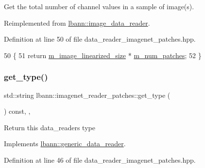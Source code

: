 Get the total number of channel values in a sample of image(s). 



Reimplemented from \hyperlink{classlbann_1_1image__data__reader_a26b8566e76ba99c017a84c49a9dec37c}{lbann\+::image\+\_\+data\+\_\+reader}.



Definition at line 50 of file data\+\_\+reader\+\_\+imagenet\+\_\+patches.\+hpp.


\begin{DoxyCode}
50                                                 \{
51     \textcolor{keywordflow}{return} \hyperlink{classlbann_1_1image__data__reader_af512f1f866c0f654309b7f28886dca9a}{m\_image\_linearized\_size} * \hyperlink{classlbann_1_1imagenet__reader__patches_a3380936d3d01d5efc77f0f129891fc65}{m\_num\_patches};
52   \}
\end{DoxyCode}
\mbox{\label{classlbann_1_1imagenet__reader__patches_adc6363b20f058260c674d92af2a6ef80}} 
\subsubsection{\texorpdfstring{get\+\_\+type()}{get\_type()}}
{\footnotesize\ttfamily std\+::string lbann\+::imagenet\+\_\+reader\+\_\+patches\+::get\+\_\+type (\begin{DoxyParamCaption}{ }\end{DoxyParamCaption}) const\hspace{0.3cm}{\ttfamily [inline]}, {\ttfamily [override]}, {\ttfamily [virtual]}}

Return this data\+\_\+reader\textquotesingle{}s type 

Implements \hyperlink{classlbann_1_1generic__data__reader_abeb849fb8e10b4fa317c90bc33f61758}{lbann\+::generic\+\_\+data\+\_\+reader}.



Definition at line 46 of file data\+\_\+reader\+\_\+imagenet\+\_\+patches.\+hpp.


